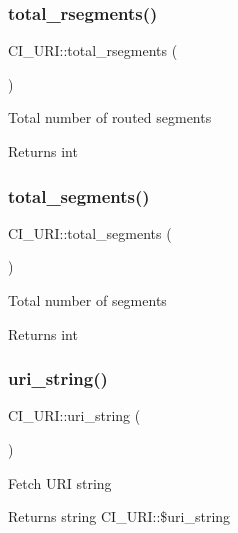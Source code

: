 \subsubsection{\texorpdfstring{total\+\_\+rsegments()}{total\_rsegments()}}
{\footnotesize\ttfamily C\+I\+\_\+\+U\+R\+I\+::total\+\_\+rsegments (\begin{DoxyParamCaption}{ }\end{DoxyParamCaption})}

Total number of routed segments

\begin{DoxyReturn}{Returns}
int 
\end{DoxyReturn}
\mbox{\label{class_c_i___u_r_i_a1706003c4745f1f7fb723e80d2fe46b0}} 
\subsubsection{\texorpdfstring{total\+\_\+segments()}{total\_segments()}}
{\footnotesize\ttfamily C\+I\+\_\+\+U\+R\+I\+::total\+\_\+segments (\begin{DoxyParamCaption}{ }\end{DoxyParamCaption})}

Total number of segments

\begin{DoxyReturn}{Returns}
int 
\end{DoxyReturn}
\mbox{\label{class_c_i___u_r_i_aca6c6880ae24154bb2bb55f70eeeb1e3}} 
\subsubsection{\texorpdfstring{uri\+\_\+string()}{uri\_string()}}
{\footnotesize\ttfamily C\+I\+\_\+\+U\+R\+I\+::uri\+\_\+string (\begin{DoxyParamCaption}{ }\end{DoxyParamCaption})}

Fetch U\+RI string

\begin{DoxyReturn}{Returns}
string C\+I\+\_\+\+U\+R\+I\+::\$uri\+\_\+string 
\end{DoxyReturn}
\mbox{\label{class_c_i___u_r_i_a23e4e4bd90f415dbff459dffe3e6b075}} 
